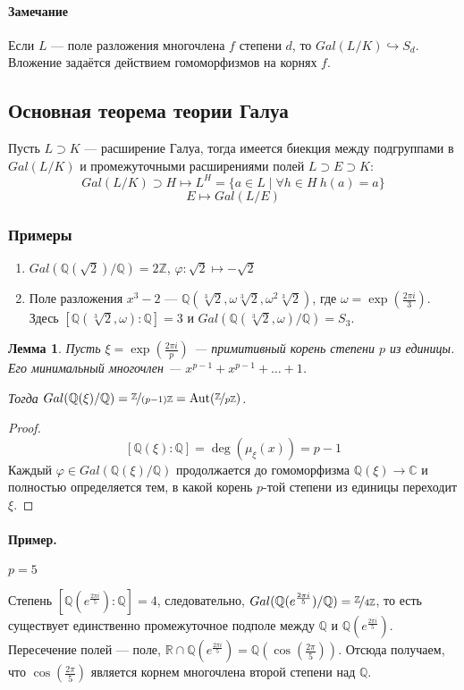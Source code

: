 \documentclass[a4paper]{article}
\newcommand{\R}{\ensuremath{\mathbb{R}}}
\newcommand{\Q}{\ensuremath{\mathbb{Q}}}
\newcommand{\Z}{\ensuremath{\mathbb{Z}}}
\let\temp\phi
\let\phi\varphi
\let\varphi\temp
\DeclareMathOperator{\Aut}{Aut}
\numberwithin{theorem}{section}
\newtheorem{lemma}{Лемма}
\numberwithin{lemma}{section}
\numberwithin{proposition}{section}
\numberwithin{corollary}{section}
\begin{document}
\paragraph*{Замечание}
Если $L$ --- поле разложения многочлена $f$ степени $d$,
то $Gal(L/K) \hookrightarrow S_d$. Вложение задаётся действием
гомоморфизмов на корнях $f$.

\subsection*{Основная теорема теории Галуа}

Пусть $L \supset K$ --- расширение Галуа, тогда имеется биекция между
подгруппами в $Gal(L/K)$ и промежуточными
расширениями полей $L \supset E \supset K$:
\[Gal(L/K) \supset H \mapsto L^H = \{a \in L \mid \forall h \in H \: h(a) = a\}\]
\[E \mapsto Gal(L/E)\]

\subsubsection*{Примеры}
\begin{enumerate}
    \item $Gal(\Q(\sqrt{2}) / \Q) = 2\Z$,
          $\phi: \sqrt{2} \mapsto -\sqrt{2}$
    \item Поле разложения $x^3 - 2$ ---
    $\Q(\sqrt[3]{2}, \omega\sqrt[3]{2}, \omega^2\sqrt[3]{2})$,
    где $\omega = \exp(\frac{2\pi i}{3})$.
    Здесь $[\Q(\sqrt[3]{2}, \omega) : \Q] = 3$ и $Gal(\Q(\sqrt[3]{2}, \omega)/\Q) = S_3$.
\end{enumerate}

\begin{lemma}
Пусть $\xi = \exp(\frac{2\pi i}{p})$ --- примитивный корень степени $p$ из единицы.
Его минимальный многочлен --- $x^{p-1}+x^{p-1}+\ldots+1$.

Тогда $Gal(\Q(\xi)/\Q) = \nicefrac{\Z}{(p-1)\Z}
 = \Aut(\nicefrac{\Z}{p\Z})$.
\end{lemma}
\begin{proof}
\[[\Q(\xi):\Q] = \deg(\mu_\xi(x)) = p - 1\]
Каждый $\phi \in Gal(\Q(\xi)/\Q)$ продолжается до
гомоморфизма $\Q(\xi) \to \mathbb{C}$ и полностью определяется тем,
в какой корень $p$-той степени из единицы переходит $\xi$.
\end{proof}

\paragraph*{Пример.} $p = 5$

Степень $[\Q(e^\frac{2\pi i}{5}) : \Q] = 4$, следовательно,
$Gal(\Q(e^\frac{2\pi i}{5})/\Q) = \nicefrac{\Z}{4\Z}$, то есть
существует единственно промежуточное подполе между $\Q$ и $\Q(e^\frac{2\pi i}{5})$.
Пересечение полей --- поле, $\R \cap \Q(e^\frac{2\pi i}{5}) = \Q(\cos(\frac{2\pi}{5}))$.
Отсюда получаем, что $\cos(\frac{2\pi}{5})$ является корнем
многочлена второй степени над $\Q$.
\end{document}

